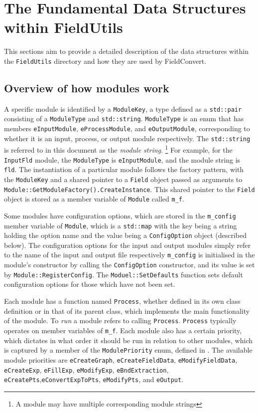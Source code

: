%
\section{The Fundamental Data Structures within FieldUtils}

This sections aim to provide a detailed description of the data structures within the \verb+FieldUtils+ directory and how they are used by FieldConvert. 


\subsection{Overview of how modules work}
A specific module is identified by a \verb+ModuleKey+, a type defined as a \verb+std::pair+ consisting of a \verb+ModuleType+ and \verb+std::string+. \verb+ModuleType+ is an enum that has members \verb+eInputModule+, \verb+eProcessModule+, and \verb+eOutputModule+, corresponding to whether it is an input, process, or output module respectively. The \verb+std::string+ is referred to in this document as the \textit{module string}. \footnote{A module may have multiple corresponding module strings} For example, for the \verb+InputFld+ module, the \verb+ModuleType+ is \verb+eInputModule+, and the module string is \verb+fld+. The instantiation of a particular module follows the factory pattern, with the \verb+ModuleKey+ and a shared pointer to a \verb+Field+ object passed as arguments to \verb+Module::GetModuleFactory().CreateInstance+. This shared pointer to the \verb+Field+ object is stored as a member variable of \verb+Module+ called \verb+m_f+.

Some modules have configuration options, which are stored in the \verb+m_config+ member variable of \verb+Module+, which is a \verb+std::map+ with the key being a string holding the option name and the value being a \verb+ConfigOption+ object (described below). The configuration options for the input and output modules simply refer to the name of the input and output file respectively \verb+m_config+ is initialised in the module's constructor by calling the \verb+ConfigOption+ constructor, and its value is set by \verb+Module::RegisterConfig+. The \verb+Moduel::SetDefaults+ function sets default configuration options for those which have not been set.

Each module has a function named \verb+Process+, whether defined in its own class definition or in that of its parent class, which implements the main functionality of the module. To \textit{run} a module refers to calling \verb+Process+. \texttt{Process} typically operates on member variables of \verb+m_f+.  Each module also has a certain priority, which dictates in what order it should be run in relation to other modules, which is captured by a member of the \verb+ModulePriority+ enum, defined in . The available module priorities are \verb+eCreateGraph+, \verb+eCreateFieldData+, \verb+eModifyFieldData+, \verb+eCreateExp+, \verb+eFillExp+, \verb+eModifyExp+, \verb+eBndExtraction+, \verb+eCreatePts+,\verb+eConvertExpToPts+, \verb+eModifyPts+, and \verb+eOutput+.


